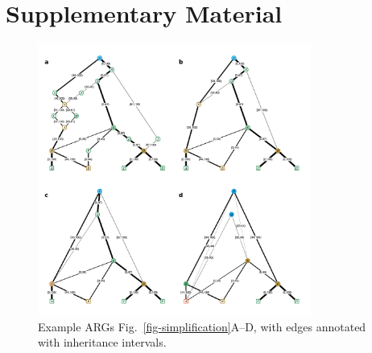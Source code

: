 \documentclass[9pt,twocolumn,twoside]{gsajnl}
\begin{document}
\clearpage
\renewcommand\thefigure{S\arabic{figure}}
\setcounter{figure}{0}
\renewcommand\thetable{S\arabic{table}}
\setcounter{table}{0}

\section*{Supplementary Material}

\begin{figure}[ht]
	\begin{center}
		\includegraphics[width=0.8\textwidth]{illustrations/simplification-with-edges.pdf}
	\end{center}
	\caption{\label{fig-simplification-with-edges}
	Example ARGs Fig.~\ref{fig-simplification}A--D,
    with edges annotated with inheritance intervals.
	}
\end{figure}
\end{document}
